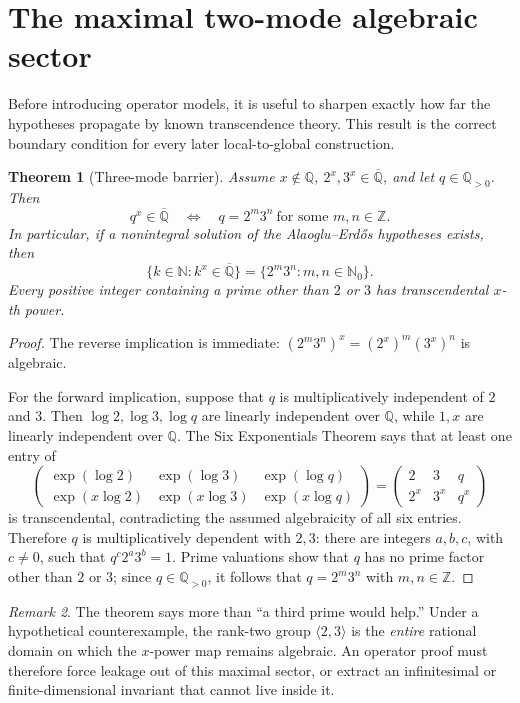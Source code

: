 \documentclass[11pt,oneside]{article}
\newtheorem{theorem}{Theorem}[section]
\theoremstyle{definition}
\theoremstyle{remark}
\newtheorem{remark}[theorem]{Remark}
\newcommand{\N}{\mathbb N}
\newcommand{\Nzero}{\mathbb N_0}
\newcommand{\Z}{\mathbb Z}
\newcommand{\Q}{\mathbb Q}
\newcommand{\Qp}{\mathbb Q_{>0}}
\newcommand{\Alg}{\overline{\mathbb Q}}
\begin{document}
\section{The maximal two-mode algebraic sector}

Before introducing operator models, it is useful to sharpen exactly how
far the hypotheses propagate by known transcendence theory.  This result
is the correct boundary condition for every later local-to-global
construction.

\begin{theorem}[Three-mode barrier]\label{thm:three-mode}
Assume \(x\notin\Q\), \(2^x,3^x\in\Alg\), and let \(q\in\Qp\).
Then
\[
        q^x\in\Alg
        \quad\Longleftrightarrow\quad
        q=2^m3^n\ \text{for some }m,n\in\Z.
\]
In particular, if a nonintegral solution of the Alaoglu--Erd\H{o}s
hypotheses exists, then
\[
 \{k\in\N:k^x\in\Alg\}
 =
 \{2^m3^n:m,n\in\Nzero\}.
\]
Every positive integer containing a prime other than \(2\) or \(3\) has
transcendental \(x\)-th power.
\end{theorem}

\begin{proof}
The reverse implication is immediate:
\((2^m3^n)^x=(2^x)^m(3^x)^n\) is algebraic.

For the forward implication, suppose that \(q\) is multiplicatively
independent of \(2\) and \(3\).  Then
\(\log2,\log3,\log q\) are linearly independent over \(\Q\), while
\(1,x\) are linearly independent over \(\Q\).  The Six Exponentials
Theorem \cite[Chap.~3]{WaldschmidtBook} says that at least one entry of
\[
\begin{pmatrix}
 \exp(\log2) & \exp(\log3) & \exp(\log q)\\
 \exp(x\log2) & \exp(x\log3) & \exp(x\log q)
\end{pmatrix}
=
\begin{pmatrix}
 2&3&q\\ 2^x&3^x&q^x
\end{pmatrix}
\]
is transcendental, contradicting the assumed algebraicity of all six
entries.  Therefore \(q\) is multiplicatively dependent with \(2,3\):
there are integers \(a,b,c\), with \(c\neq0\), such that
\(q^c2^a3^b=1\).  Prime valuations show that \(q\) has no prime factor
other than \(2\) or \(3\); since \(q\in\Qp\), it follows that
\(q=2^m3^n\) with \(m,n\in\Z\).
\end{proof}

\begin{remark}
The theorem says more than ``a third prime would help.''  Under a
hypothetical counterexample, the rank-two group
\(\langle2,3\rangle\) is the \emph{entire} rational domain on which the
\(x\)-power map remains algebraic.  An operator proof must therefore
force leakage out of this maximal sector, or extract an infinitesimal or
finite-dimensional invariant that cannot live inside it.
\end{remark}
\end{document}
